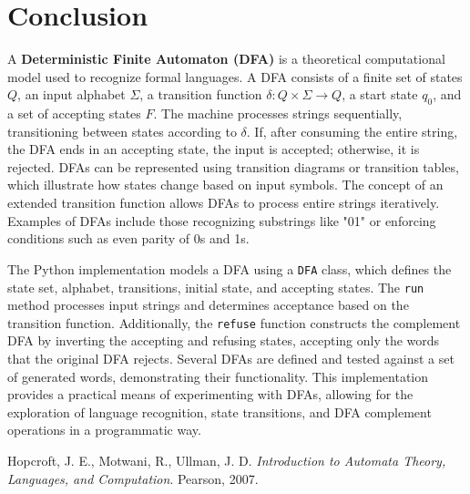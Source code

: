 \documentclass{article}
\begin{document}
\newpage

\section{Conclusion}
\maketitle

A \textbf{Deterministic Finite Automaton (DFA)} is a theoretical computational model used to recognize formal languages. A DFA consists of a finite set of states \( Q \), an input alphabet \( \Sigma \), a transition function \( \delta: Q \times \Sigma \to Q \), a start state \( q_0 \), and a set of accepting states \( F \). The machine processes strings sequentially, transitioning between states according to \( \delta \). If, after consuming the entire string, the DFA ends in an accepting state, the input is accepted; otherwise, it is rejected. DFAs can be represented using transition diagrams or transition tables, which illustrate how states change based on input symbols. The concept of an extended transition function allows DFAs to process entire strings iteratively. Examples of DFAs include those recognizing substrings like "01" or enforcing conditions such as even parity of 0s and 1s.

The Python implementation models a DFA using a \texttt{DFA} class, which defines the state set, alphabet, transitions, initial state, and accepting states. The \texttt{run} method processes input strings and determines acceptance based on the transition function. Additionally, the \texttt{refuse} function constructs the complement DFA by inverting the accepting and refusing states, accepting only the words that the original DFA rejects. Several DFAs are defined and tested against a set of generated words, demonstrating their functionality. This implementation provides a practical means of experimenting with DFAs, allowing for the exploration of language recognition, state transitions, and DFA complement operations in a programmatic way.

\newpage

\begin{thebibliography}{9}
 Hopcroft, J. E., Motwani, R., Ullman, J. D. \textit{Introduction to Automata Theory, Languages, and Computation}. Pearson, 2007.
\end{thebibliography}
\end{document}
